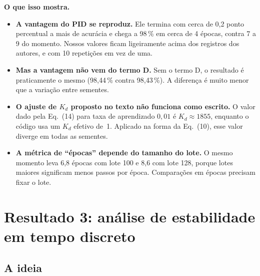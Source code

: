 \documentclass[11pt,a4paper]{article}
\begin{document}
\textbf{O que isso mostra.}
\begin{itemize}
  \item \textbf{A vantagem do PID se reproduz.} Ele termina com cerca de
        0,2 ponto percentual a mais de acurácia e chega a 98\,\% em cerca de 4
        épocas, contra 7 a 9 do momento. Nossos valores ficam ligeiramente acima
        dos registros dos autores, e com 10 repetições em vez de uma.
  \item \textbf{Mas a vantagem não vem do termo D.} Sem o termo D, o resultado
        é praticamente o mesmo (98,44\,\% contra 98,43\,\%). A diferença é muito
        menor que a variação entre sementes.
  \item \textbf{O ajuste de $K_d$ proposto no texto não funciona como escrito.} O
        valor dado pela Eq.~(14) para taxa de aprendizado $0{,}01$ é
        $K_d \approx 1855$, enquanto o código usa um $K_d$ efetivo de~1. Aplicado na
        forma da Eq.~(10), esse valor diverge em todas as sementes.
  \item \textbf{A métrica de ``épocas'' depende do tamanho do lote.} O mesmo
        momento leva 6,8 épocas com lote 100 e 8,6 com lote 128, porque lotes maiores
        significam menos passos por época. Comparações em épocas precisam fixar o lote.
\end{itemize}

\section{Resultado 3: análise de estabilidade em tempo discreto}

\subsection{A ideia}
\end{document}
